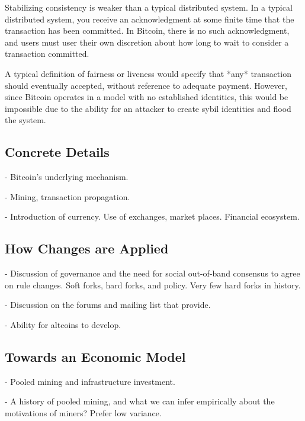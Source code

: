 Stabilizing consistency is weaker than a typical distributed system. In a typical distributed system, you receive an acknowledgment at some finite time that the transaction has been committed. In Bitcoin, there is no such acknowledgment, and users must user their own discretion about how long to wait to consider a transaction committed. 

A typical definition of fairness or liveness would specify that *any* transaction should eventually accepted, without reference to adequate payment. However, since Bitcoin operates in a model with no established identities, this would be impossible due to the ability for an attacker to create sybil identities and flood the system.

\subsection{Concrete Details}
- Bitcoin's underlying mechanism.

- Mining, transaction propagation.

- Introduction of currency. Use of exchanges, market places. Financial ecosystem.

\subsection{How Changes are Applied}

- Discussion of governance and the need for social out-of-band consensus to agree on rule changes. Soft forks, hard forks, and policy. Very few hard forks in history.

- Discussion on the forums and mailing list that provide.

- Ability for altcoins to develop.

\subsection{Towards an Economic Model}

- Pooled mining and infrastructure investment.

- A history of pooled mining, and what we can infer empirically about the motivations of miners? Prefer low variance.

